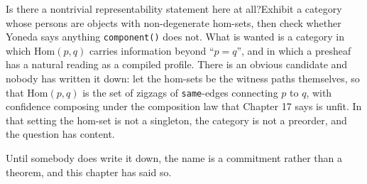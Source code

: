 \begin{Open}{Is there a nontrivial representability statement here at all?}{Exhibit a category whose persons are objects with non-degenerate hom-sets, then check whether Yoneda says anything \texttt{component()} does not.}
What is wanted is a category in which $\mathrm{Hom}(p,q)$ carries information beyond ``$p = q$'', and in which a presheaf has a natural reading as a compiled profile. There is an obvious candidate and nobody has written it down: let the hom-sets be the witness paths themselves, so that $\mathrm{Hom}(p,q)$ is the set of zigzags of \texttt{same}-edges connecting $p$ to $q$, with confidence composing under the composition law that Chapter 17 says is unfit. In that setting the hom-set is not a singleton, the category is not a preorder, and the question has content.

Until somebody does write it down, the name is a commitment rather than a theorem, and this chapter has said so.
\end{Open}
